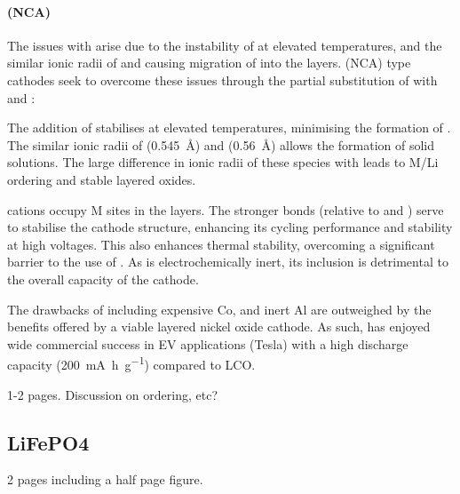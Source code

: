 \paragraph{ (NCA)}
The issues with  arise due to the instability of  at elevated temperatures, and the similar ionic radii of  and  causing migration of  into the  layers.
 (NCA) type cathodes seek to overcome these issues through the partial substitution of  with  and :
\begin{labeling}{\textbf{}}
\item [\textbf{\ce{Co^3+}}] The addition of  stabilises  at elevated temperatures, minimising the formation of .
The similar ionic radii of  (\SI{0.545}{\angstrom}) and  (\SI{0.56}{\angstrom}) allows the formation of  solid solutions.
The large difference in ionic radii of these species with  leads to M/Li ordering and stable layered oxides.

\item [\textbf{\ce{Al^3+}}]  cations occupy M sites in the  layers.
The stronger  bonds (relative to  and ) serve to stabilise the cathode structure, enhancing its cycling performance and stability at high voltages.
This also enhances thermal stability, overcoming a significant barrier to the use of .
As  is electrochemically inert, its inclusion is detrimental to the overall capacity of the cathode.
\end{labeling}

The drawbacks of including expensive Co, and inert Al are outweighed by the benefits offered by a viable layered nickel oxide cathode.
As such,  has enjoyed wide commercial success in EV applications (Tesla) with a high discharge capacity (\SI{200}{\milli\ampere\hour\per\gram}) compared to LCO.
\cite{Nitta2015}



\newpage

1-2 pages.
Discussion on ordering, etc?



\subsection{LiFePO4}
2 pages including a half page figure.

